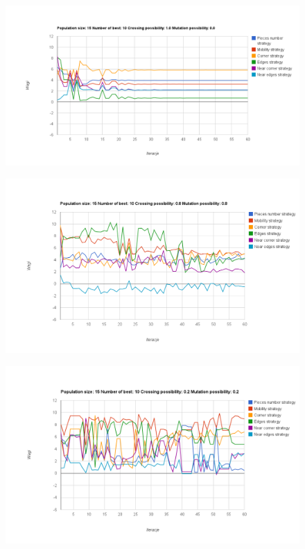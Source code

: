 \pagebreak

\begin{figure}[h!]
\centering
\includegraphics[width=\textwidth]{img/chart13.png}
\end{figure}

\begin{figure}[h!]
\centering
\includegraphics[width=\textwidth]{img/chart14.png}
\end{figure}

\pagebreak

\begin{figure}[h!]
\centering
\includegraphics[width=\textwidth]{img/chart17.png}
\end{figure}

